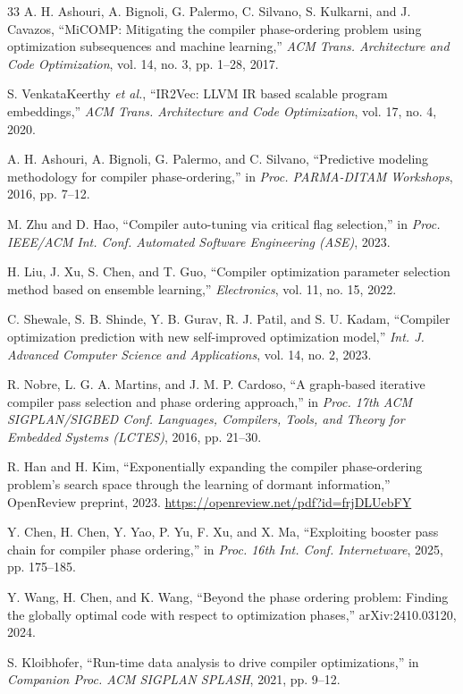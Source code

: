 \documentclass[conference]{IEEEtran}
\begin{document}
\begin{thebibliography}{33}
A. H. Ashouri, A. Bignoli, G. Palermo, C. Silvano, S. Kulkarni, and J. Cavazos,
``MiCOMP: Mitigating the compiler phase-ordering problem using optimization subsequences and machine learning,''
\textit{ACM Trans. Architecture and Code Optimization}, vol. 14, no. 3, pp. 1--28, 2017.

S. VenkataKeerthy \textit{et al.},
``IR2Vec: LLVM IR based scalable program embeddings,''
\textit{ACM Trans. Architecture and Code Optimization}, vol. 17, no. 4, 2020.

A. H. Ashouri, A. Bignoli, G. Palermo, and C. Silvano,
``Predictive modeling methodology for compiler phase-ordering,''
in \textit{Proc. PARMA-DITAM Workshops}, 2016, pp. 7--12.

M. Zhu and D. Hao,
``Compiler auto-tuning via critical flag selection,''
in \textit{Proc. IEEE/ACM Int. Conf. Automated Software Engineering (ASE)}, 2023.

H. Liu, J. Xu, S. Chen, and T. Guo,
``Compiler optimization parameter selection method based on ensemble learning,''
\textit{Electronics}, vol. 11, no. 15, 2022.

C. Shewale, S. B. Shinde, Y. B. Gurav, R. J. Patil, and S. U. Kadam,
``Compiler optimization prediction with new self-improved optimization model,''
\textit{Int. J. Advanced Computer Science and Applications}, vol. 14, no. 2, 2023.

R. Nobre, L. G. A. Martins, and J. M. P. Cardoso,
``A graph-based iterative compiler pass selection and phase ordering approach,''
in \textit{Proc. 17th ACM SIGPLAN/SIGBED Conf. Languages, Compilers, Tools, and Theory for Embedded Systems (LCTES)}, 2016, pp. 21--30.

R. Han and H. Kim,
``Exponentially expanding the compiler phase-ordering problem's search space through the learning of dormant information,'' OpenReview preprint, 2023.
\url{https://openreview.net/pdf?id=frjDLUebFY}

Y. Chen, H. Chen, Y. Yao, P. Yu, F. Xu, and X. Ma,
``Exploiting booster pass chain for compiler phase ordering,''
in \textit{Proc. 16th Int. Conf. Internetware}, 2025, pp. 175--185.

Y. Wang, H. Chen, and K. Wang,
``Beyond the phase ordering problem: Finding the globally optimal code with respect to optimization phases,'' arXiv:2410.03120, 2024.

S. Kloibhofer,
``Run-time data analysis to drive compiler optimizations,''
in \textit{Companion Proc. ACM SIGPLAN SPLASH}, 2021, pp. 9--12.


\end{thebibliography}
\end{document}
